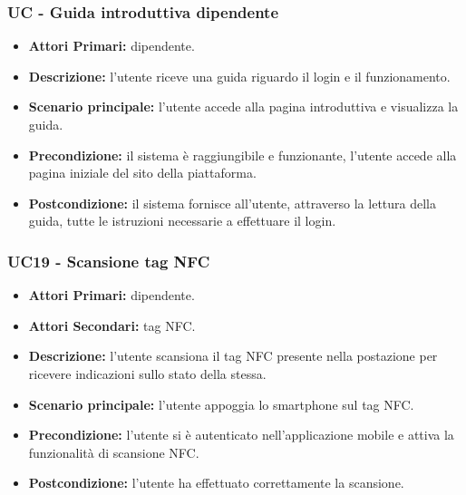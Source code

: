 \subsubsection{ UC - Guida introduttiva dipendente}
\begin{itemize}
	\item\textbf{Attori Primari:} dipendente.
	\item\textbf{Descrizione:} l'utente riceve una guida riguardo il login e il funzionamento.
	\item\textbf{Scenario principale:} l’utente accede alla pagina introduttiva e visualizza la guida.
	\item\textbf{Precondizione:} il sistema è raggiungibile e funzionante, l’utente accede alla pagina iniziale del sito della piattaforma.
	\item\textbf{Postcondizione:} il sistema fornisce all’utente, attraverso la lettura della guida, tutte le istruzioni necessarie a effettuare il login.
\end{itemize}

\subsubsection{ UC19 - Scansione tag NFC}
\begin{itemize}
	\item\textbf{Attori Primari:} dipendente.
	\item\textbf{Attori Secondari:} tag NFC.
	\item\textbf{Descrizione:} l’utente scansiona il tag NFC presente nella postazione per ricevere indicazioni sullo stato della stessa.
	\item\textbf{Scenario principale:} l’utente appoggia lo smartphone sul tag NFC.
	\item\textbf{Precondizione:} l’utente si è autenticato nell'applicazione mobile e attiva la funzionalità di scansione NFC.
	\item\textbf{Postcondizione:} l’utente ha effettuato correttamente la scansione.
\end{itemize}

